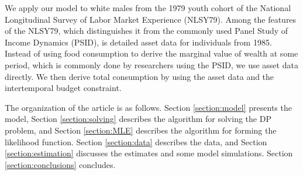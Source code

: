 \documentclass[\econtexRoot/ImaiKeane]{subfiles}
\begin{document}
We apply our model to white males from the 1979 youth cohort of the National Longitudinal Survey of Labor Market Experience (NLSY79). Among the features of the NLSY79, which distinguishes it from the commonly used Panel Study of Income Dynamics (PSID), is detailed asset data for individuals from 1985. Instead of using food consumption to derive the marginal value of wealth at some period, which is commonly done by researchers using the PSID, we use asset data directly. We then derive total consumption by using the asset data and the intertemporal budget constraint. \par
The organization of the article is as follows. Section \ref{section:model} presents the model, Section \ref{section:solving} describes the algorithm for solving the DP problem, and Section \ref{section:MLE} describes the algorithm for forming the likelihood function. Section \ref{section:data} describes the data, and Section \ref{section:estimation} discusses the estimates and some model simulations. Section \ref{section:conclusions} concludes.
\end{document}
